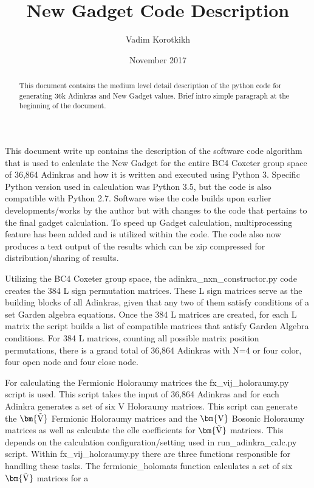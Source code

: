 \documentclass[12pt, letterpaper]{article}
\title{New Gadget Code Description}
\author{Vadim Korotkikh}
\date{November 2017}
\def\brV{{\bm {\rm V}}}
\def\brtV{{\bm{\tilde{\rm V}}}}
\begin{document}
\maketitle

\begin{abstract}
This document contains the medium level detail description of the python code
for generating 36k Adinkras and New Gadget values. Brief intro simple paragraph
at the beginning of the document.
\end{abstract}

This document write up contains the description of the software code algorithm
that is used to calculate the New Gadget for the entire BC4 Coxeter group space
of 36,864 Adinkras and how it is written and executed using Python 3.
Specific Python version used in calculation was Python 3.5, but the code is also
compatible with Python 2.7.
Software wise the code builds upon earlier developments/works by the author but
with changes to the code that pertains to the final gadget calculation.
To speed up Gadget calculation, multiprocessing feature has been added and is
utilized within the code. The code also now produces a text output of the
results which can be zip compressed for distribution/sharing of results.\par
Utilizing the BC4 Coxeter group space, the adinkra{\_}nxn{\_}constructor.py
code creates the 384 L sign permutation matrices. These L sign matrices serve as the building
blocks of all Adinkras, given that any two of them satisfy conditions of a set Garden algebra
equations. Once the 384 L matrices are created, for each L matrix the script builds a list of
compatible matrices that satisfy Garden Algebra conditions. For 384 L matrices, counting all
possible matrix position permutations, there is a grand total of 36,864 Adinkras with N=4 or
four color, four open node and four close node.\par
For calculating the Fermionic Holoraumy matrices the
fx{\_}vij{\_}holoraumy.py script is used.
This script takes the input of 36,864 Adinkras and for each Adinkra generates a set of six
V Holoraumy matrices. This script can generate the $\brtV$ Fermionic Holoraumy matrices and the
$\brV$ Bosonic Holoraumy matrices as well as calculate the elle coefficients for $\brtV$ matrices.
This depends on the calculation configuration/setting used in run{\_}adinkra{\_}calc.py
script. Within fx{\_}vij{\_}holoraumy.py there are three functions responsible for handling these tasks.
The fermionic{\_}holomats function calculates a set of six $\brtV$ matrices for a
\end{document}
